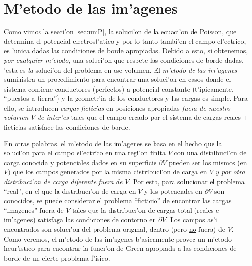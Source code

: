 \section{M'etodo de las im'agenes}
Como vimos la secci'on \ref{sec:uniP}, la soluci'on de la ecuaci'on de Poisson, que determina el potencial electrost'atico y por lo tanto tambi'en el campo el'ectrico, es 'unica dadas las condiciones de borde apropiadas. Debido a esto, si
obtenemos, \textit{por cualquier m'etodo}, una soluci'on que respete las condiciones de
borde dadas, 'esta es \textit{la} soluci'on del problema en ese volumen. El \textit{m'etodo de
las im'agenes} suministra un procedimiento para encontrar una soluci'on en
casos donde el sistema contiene conductores (perfectos) a potencial constante
(t'ipicamente, ``puestos a tierra'') y la geometr'ia de los conductores y las
cargas es simple. Para ello, se introducen \textit{cargas ficticias} en
posiciones apropiadas \textit{fuera de nuestro volumen $V$ de inter'es} tales que el campo creado por el sistema de cargas reales
+ ficticias satisface las condiciones de borde.

En otras palabras, el m'etodo de las im'agenes se basa en el hecho que la
soluci'on para el campo el'ectrico en una regi'on finita $V$ con una
distribuci'on de carga conocida y potenciales dados en su superficie
$\partial V$ pueden ser los mismos (\underline{en $V$}) que los campos generados por la
misma distribuci'on de carga en $V$ \textit{y por otra distribuci'on de carga
diferente fuera de $V$}. Por esto, para solucionar el problema ``real'', en el
que la distribuci'on de carga en $V$ y los potenciales en $\partial V$ son conocidos, se
puede considerar el problema ``ficticio'' de encontrar las cargas ``imagenes''
fuera de $V$ tales que la distribuci'on de cargas total (reales e im'agenes)
satisfaga las condiciones de contorno en $\partial V$. Los campos as'i encontrados son
soluci'on del problema original, dentro (pero \underline{no} fuera) de $V$. Como veremos, el m'etodo de las im'agenes b'asicamente provee un m'etodo heur'istico para encontrar la funci'on de Green apropiada a las condiciones de borde de un cierto problema f'isico.



